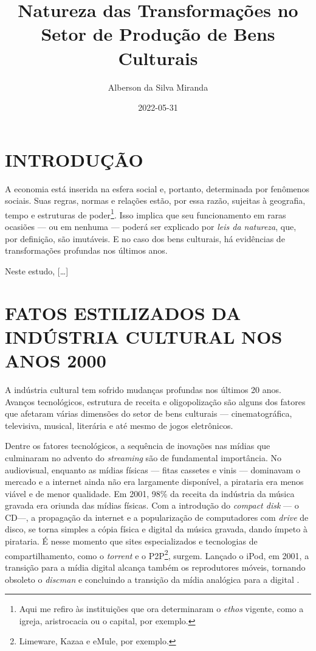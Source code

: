\documentclass[
]{article}
\title{Natureza das Transformações no Setor de Produção de Bens
Culturais}
\author{Alberson da Silva Miranda}
\date{2022-05-31}
\begin{document}
\maketitle

\hypertarget{introduuxe7uxe3o}{%
\section*{INTRODUÇÃO}\label{introduuxe7uxe3o}}

A economia está inserida na esfera social e, portanto, determinada por
fenômenos sociais. Suas regras, normas e relações estão, por essa razão,
sujeitas à geografia, tempo e estruturas de
poder\footnote{Aqui me refiro às instituições que ora determinaram o \textit{ethos} vigente, como a igreja, aristrocacia ou o capital, por exemplo.}.
Isso implica que seu funcionamento em raras ocasiões --- ou em nenhuma
--- poderá ser explicado por \emph{leis da natureza}, que, por
definição, são imutáveis. E no caso dos bens culturais, há evidências de
transformações profundas nos últimos anos.

Neste estudo, {[}\ldots{]}

\hypertarget{fatos-estilizados-da-induxfastria-cultural-nos-anos-2000}{%
\section{FATOS ESTILIZADOS DA INDÚSTRIA CULTURAL NOS ANOS
2000}\label{fatos-estilizados-da-induxfastria-cultural-nos-anos-2000}}

A indústria cultural tem sofrido mudanças profundas nos últimos 20 anos.
Avanços tecnológicos, estrutura de receita e oligopolização são alguns
dos fatores que afetaram várias dimensões do setor de bens culturais ---
cinematográfica, televisiva, musical, literária e até mesmo de jogos
eletrônicos.

Dentre os fatores tecnológicos, a sequência de inovações nas mídias que
culminaram no advento do \emph{streaming} são de fundamental
importância. No audiovisual, enquanto as mídias físicas --- fitas
cassetes e vinis --- dominavam o mercado e a internet ainda não era
largamente disponível, a pirataria era menos viável e de menor
qualidade. Em 2001, 98\% da receita da indústria da música gravada era
oriunda das mídias físicas. Com a introdução do \emph{compact disk} ---
o CD---, a propagação da internet e a popularização de computadores com
\emph{drive} de disco, se torna simples a cópia física e digital da
música gravada, dando ímpeto à pirataria. É nesse momento que sites
especializados e tecnologias de compartilhamento, como o \emph{torrent}
e o P2P\footnote{Limeware, Kazaa e eMule, por exemplo.}, surgem. Lançado
o iPod, em 2001, a transição para a mídia digital alcança também os
reprodutores móveis, tornando obsoleto o \emph{discman} e concluindo a
transição da mídia analógica para a digital \citet{commons}.
\end{document}
